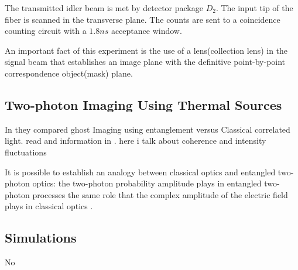 The transmitted idler beam is met by detector 
package $D_2$. The input tip of the fiber is scanned in the transverse 
plane. The counts are sent to a coincidence 
counting circuit with a $1.8ns$ acceptance window.


An important fact of this experiment is the use of a lens(collection lens) in the signal beam that establishes an image plane with the definitive point-by-point correspondence object(mask) plane.




\subsection{Two-photon Imaging Using Thermal Sources}

In \cite{thermal} they compared ghost Imaging using entanglement versus Classical correlated light. read and information in \cite{thermalAlejandra}. here i talk about coherence and intensity fluctuations \cite{intensity}

It is possible to establish an analogy
between classical optics and entangled two-photon optics:
the two-photon probability amplitude plays in entangled
two-photon processes the same role that the complex amplitude
of the electric field plays in classical optics  \cite{thermalAlejandra}.

\subsection{Simulations}

No\cite{simulated}



